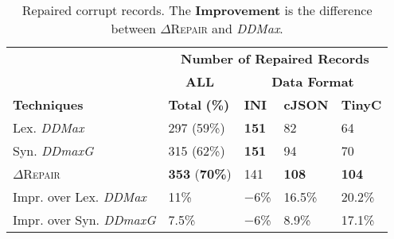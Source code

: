 \documentclass[acmsmall,screen,review,anonymous]{acmart}
\newcommand{\formatfree}{format-free\xspace}
\newcommand{\dtask}{data repair\xspace}
\newcommand{\approach}{\textsc{$\Delta$Repair}\xspace}
\newcommand{\ddmax}{\textit{DDMax}\xspace}
\newcommand{\ddmaxg}{\textit{DDmaxG}\xspace}
\newcommand{\drepair}{\approach}
\begin{document}
%

\begin{table}[!tbp]
\centering
  \caption{Repaired corrupt records. The \textbf{Improvement} is the difference between \drepair and \ddmax.}
\begin{tabular}{|p{4.0cm}|p{1.5cm}|p{1.5cm}|p{1.5cm}|p{1.5cm}|}
\hline
&  \multicolumn{4}{c|}{\textbf{Number of Repaired Records}}  \\
&  \multicolumn{1}{c|}{\textbf{ALL}} & \multicolumn{3}{c|}{\textbf{Data Format}}  \\
\textbf{Techniques} & \textbf{Total} \textbf{(\%)} & \textbf{INI} & \textbf{cJSON} & \textbf{TinyC} \\
\hline
Lex. \ddmax & 297 (59\%) & \textbf{151}  & 82  & 64  \\ 		
Syn. \ddmaxg & 315 (62\%) & \textbf{151}  & 94  & 70  \\ 	
\approach  & \textbf{353} (\textbf{70\%}) & 141 & \textbf{108}  & \textbf{104} \\
\hline
Impr. over Lex. \ddmax &  11\%  & $-$6\% & 16.5\% & 20.2\% \\
Impr. over Syn. \ddmaxg &  7.5\%  & $-$6\% & 8.9\% & 17.1\% \\
\hline
\end{tabular}
\label{tab:effectiveness}
\end{table}

%
\end{document}

